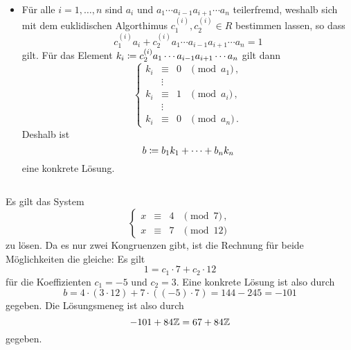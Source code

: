 \begin{itemize}
  \item
    Für alle $i = 1, \dotsc, n$ sind $a_i$ und $a_1 \dotsm a_{i-1} a_{i+1} \dotsm a_n$ teilerfremd, weshalb sich mit dem euklidischen Algorthimus $c^{(i)}_1, c^{(i)}_2 \in R$ bestimmen lassen, so dass
    \[
      c^{(i)}_1 a_i + c^{(i)}_2 a_1 \dotsm a_{i-1} a_{i+1} \dotsm a_n = 1
    \]
    gilt.
    Für das Element $k_i \coloneqq c^{(i)}_2 a_1 \dotsm a_{i-1} a_{i+1} \dotsm a_n$ gilt dann
    \[
      \left\{
        \begin{array}{rcll}
          k_i &\equiv&  0 & \pmod{a_1}  \,, \\
              &\vdots&    &               \\
          k_i &\equiv&  1 & \pmod{a_i}  \,, \\
              &\vdots&    &               \\
          k_i &\equiv&  0 & \pmod{a_n}  \,.
        \end{array}
      \right.
    \]
    Deshalb ist
    \[
              b
      \coloneqq b_1 k_1 + \dotsb + b_n k_n
    \]
    eine konkrete Lösung.
\end{itemize}





\addtocounter{subsection}{2}





\subsection{}

Es gilt das System
\[
  \left\{
    \begin{array}{rcll}
      x &\equiv& 4 & \pmod{7}   \,, \\
      x &\equiv& 7 & \pmod{12}
    \end{array}
  \right.
\]
zu lösen.
Da es nur zwei Kongruenzen gibt, ist die Rechnung für beide Möglichkeiten die gleiche:
Es gilt
\[
  1 = c_1 \cdot 7 + c_2 \cdot 12
\]
für die Koeffizienten $c_1 = -5$ und $c_2 = 3$.
Eine konkrete Lösung ist also durch
\[
    b
  = 4 \cdot (3 \cdot 12) + 7 \cdot ((-5) \cdot 7)
  = 144 - 245
  = -101
\]
gegeben.
Die Lösungsmeneg ist also durch
\[
    -101 + 84 \mathbb{Z}
  =   67 + 84 \mathbb{Z}
\]
gegeben.





\subsection{}

